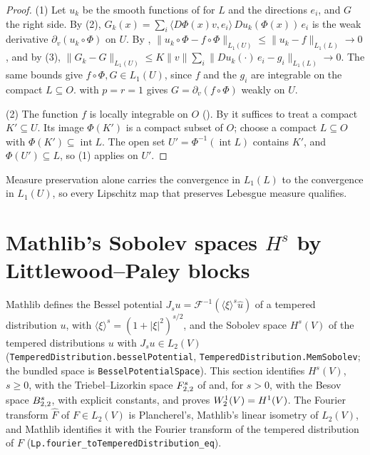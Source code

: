 \begin{proof}
\leanok
(1) Let $u_k$ be the smooth functions of  for $L$ and the
directions $e_i$, and $G$ the right side. By  (2),
$G_k(x) = \sum_i \langle D\Phi(x) v, e_i \rangle \, D u_k(\Phi(x)) \, e_i$ is the weak derivative
$\partial_v (u_k \circ \Phi)$ on $U$. By ,
$\|u_k \circ \Phi - f \circ \Phi\|_{L_1(U)} \leq \|u_k - f\|_{L_1(L)} \to 0$, and by
 (3),
$\|G_k - G\|_{L_1(U)} \leq K \|v\| \sum_i \|D u_k(\cdot) \, e_i - g_i\|_{L_1(L)} \to 0$. The
same bounds give $f \circ \Phi, G \in L_1(U)$, since $f$ and the $g_i$ are integrable on the
compact $L \subseteq O$.  with $p = r = 1$ gives
$G = \partial_v (f \circ \Phi)$ weakly on $U$.

(2) The function $f$ is locally integrable on $O$ ().
By  it suffices to treat a compact $K' \subseteq U$. Its
image $\Phi(K')$ is a compact subset of $O$; choose a compact $L \subseteq O$ with
$\Phi(K') \subseteq \operatorname{int} L$. The open set $U' = \Phi^{-1}(\operatorname{int} L)$
contains $K'$, and $\Phi(U') \subseteq L$, so (1) applies on $U'$.
\end{proof}

Measure preservation alone carries the convergence in $L_1(L)$ to the convergence in $L_1(U)$,
so every Lipschitz map that preserves Lebesgue measure qualifies.

\section{Mathlib's Sobolev spaces \texorpdfstring{$H^s$}{H\^{}s} by Littlewood--Paley blocks}
\label{sec:sobolev-two-littlewood-paley}

Mathlib defines the Bessel potential $J_s u = \mathcal F^{-1}(\langle \xi \rangle^s \widehat u)$ of
a tempered distribution $u$, with $\langle \xi \rangle^s = (1 + |\xi|^2)^{s/2}$, and the Sobolev
space $H^s(V)$ of the tempered distributions $u$ with $J_s u \in L_2(V)$
(\texttt{TemperedDistribution.\allowbreak besselPotential},
\texttt{TemperedDistribution.\allowbreak MemSobolev}; the bundled space is
\texttt{BesselPotentialSpace}). This section identifies $H^s(V)$, $s \geq 0$, with the
Triebel--Lizorkin space $F^{s}_{2,2}$ of  and, for $s > 0$, with the
Besov space $B^{s}_{2,2}$, with explicit constants, and proves $W^{1}_{2}(V) = H^1(V)$. The
Fourier transform $\widehat F$ of $F \in L_2(V)$ is Plancherel's, Mathlib's linear isometry of
$L_2(V)$, and Mathlib identifies it with the Fourier transform of the tempered distribution of
$F$ (\texttt{Lp.\allowbreak fourier\_\allowbreak toTemperedDistribution\_\allowbreak eq}).

